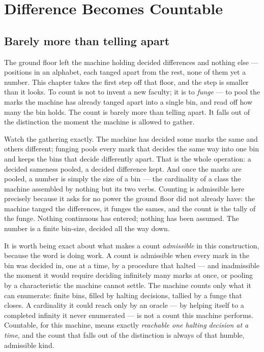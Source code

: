 \chapter{Difference Becomes Countable}

\section{Barely more than telling apart}

The ground floor left the machine holding decided differences and nothing else --- positions in an alphabet, each
tanged apart from the rest, none of them yet a number. This chapter takes the first step off that floor, and the step
is smaller than it looks. To count is not to invent a new faculty; it is to \emph{funge} --- to pool the marks the
machine has already tanged apart into a single bin, and read off how many the bin holds. The count is barely more than
telling apart. It falls out of the distinction the moment the machine is allowed to gather.

Watch the gathering exactly. The machine has decided some marks the same and others different; funging pools every mark
that decides the same way into one bin and keeps the bins that decide differently apart. That is the whole operation:
a decided sameness pooled, a decided difference kept. And once the marks are pooled, a number is simply the size of a
bin --- the cardinality of a class the machine assembled by nothing but its two verbs. Counting is admissible here
precisely because it asks for no power the ground floor did not already have: the machine tanged the differences, it
funges the sames, and the count is the tally of the funge. Nothing continuous has entered; nothing has been assumed.
The number is a finite bin-size, decided all the way down.

It is worth being exact about what makes a count \emph{admissible} in this construction, because the word is doing
work. A count is admissible when every mark in the bin was decided in, one at a time, by a procedure that halted --- and
inadmissible the moment it would require deciding infinitely many marks at once, or pooling by a characteristic the
machine cannot settle. The machine counts only what it can enumerate: finite bins, filled by halting decisions,
tallied by a funge that closes. A cardinality it could reach only by an oracle --- by helping itself to a completed
infinity it never enumerated --- is not a count this machine performs. Countable, for this machine, means exactly
\emph{reachable one halting decision at a time}, and the count that falls out of the distinction is always of that
humble, admissible kind.

